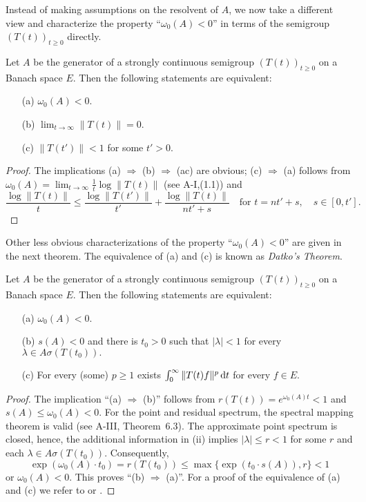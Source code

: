 Instead of making assumptions on the resolvent of $ A $, we now take a different view and characterize the property \enquote{$ \omega_0(A) < 0 $} in terms of the semigroup $ (T(t))_{t \geq 0} $ directly.
\begin{proposition} \label{prop:a4-1.10} Let $ A $ be the generator of a strongly continuous semigroup $ (T(t))_{t \geq 0} $ on a Banach space $E$. 
Then the following statements are equivalent:
\begin{itemize}
\item[(a)] $ \omega_0(A) < 0 $.
\item[(b)] $ \lim_{t \to \infty} \| T(t) \| = 0 $.
\item[(c)] $ \| T(t') \| < 1 $ for some $ t' > 0 $.
\end{itemize}
\end{proposition}

\begin{proof}
The implications (a) $ \Rightarrow $ (b) $ \Rightarrow $ (ac) are obvious; (c) $ \Rightarrow $ (a) follows from  $\omega_0(A) = \lim_{t \to \infty} \frac{1}{t} \log \| T(t) \|$ (see A-I,(1.1)) and  
\[
\displaystyle
\frac{\log \|T(t)\|}{t} \leq \frac{\log \|T(t')\|}{t'} + \frac{\log \|T(t)\|}{nt' + s} \quad \text{for } t = nt' + s, \quad s \in [0,t'].
\]
\end{proof}

 Other less obvious characterizations of the property ``$ \omega_0(A) < 0 $'' are given in the next theorem. 
The equivalence of (a) and (c) is known as \emph{Datko’s Theorem}.


\begin{theorem} \label{thm:a4-1.11} Let $ A $ be the generator of a strongly continuous semigroup $ (T(t))_{t \geq 0} $ on a Banach space $ E $. 
Then the following statements are equivalent:
\begin{itemize}
\item[(a)] $ \omega_0(A) < 0 $.
\item[(b)] $ s(A) < 0 $ and there is $ t_0 > 0 $ such that  
$
|\lambda| < 1$ for every $ \lambda \in A\sigma (T(t_0)).$
\item[(c)] For every (some) $ p \geq 1 $ exists $ \int_{0}^{\infty} \| T(t) f \|^p\mathop{}\!\mathrm{d}{t} $ for every $ f \in E $.
\end{itemize}
\end{theorem}

\begin{proof} The implication ``(a) $ \Rightarrow $ (b)'' follows from $ r(T(t)) = e^{\omega_0(A) t} < 1 $ and $ s(A) \leq \omega_0(A) < 0 $. For the point and residual spectrum, the spectral mapping theorem is valid (see A-III, Theorem~6.3). The approximate point spectrum is closed, hence, the additional information in (ii)
implies $ |\lambda| \leq r < 1 $ for some $ r $ and each $ \lambda \in A\sigma(T(t_0)) $. 
Consequently, 
\[
\exp(\omega_0(A) \cdot t_0) = r(T(t_0)) \leq \max\{\exp(t_0 \cdot s(A)), r\} < 1
\]
or $ \omega_0(A) < 0 $. 
This proves \textquotedblleft (b) $\Rightarrow$ (a)\textquotedblright. 
For a proof of the equivalence of (a) and (c) we refer to \citet{datko:1972} or \citet[Thm.4.4.1]{pazy:1983}. 
\end{proof}

